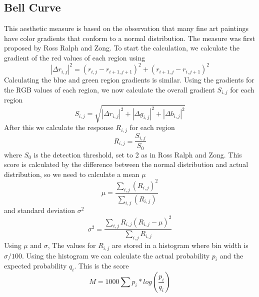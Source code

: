 \documentclass{article}
\begin{document}
\subsection*{Bell Curve}
This aesthetic measure is based on the observation that many fine art paintings have color gradients that conform to a normal distribution. The measure was first proposed by Ross Ralph and Zong.
To start the calculation, we calculate the gradient of the red values of each region using
\begin{equation*}
    |\Delta r_{i,j}|^2 = (r_{i,j} - r_{i+1,j+1})^2 + (r_{i+1,j} - r_{i,j+1})^2
\end{equation*}
Calculating the blue and green region gradients is similar. Using the gradients for the RGB values of each region, we now calculate the overall gradient $S_{i,j}$ for each region
\begin{equation*}
    S_{i,j} = \sqrt{|\Delta r_{i,j}|^2 + |\Delta g_{i,j}|^2 + |\Delta b_{i,j}|^2}
\end{equation*}
After this we calculate the response $R_{i,j}$ for each region 
\begin{equation*}
    R_{i,j} = \frac{S_{i,j}}{S_0}
\end{equation*}
where $S_0$ is the detection threshold, set to 2 as in Ross Ralph and Zong.
This score is calculated by the difference between the normal distribution and actual distribution, so we need to calculate a mean $\mu$
\begin{equation*}
    \mu = \frac{\sum_{i,j}(R_{i,j})^2}{\sum_{i,j}(R_{i,j})}
\end{equation*}
and standard deviation $\sigma^2$
\begin{equation*}
    \sigma^2 = \frac{\sum_{i,j}R_{i,j}(R_{i,j} - \mu)^2}{\sum_{i,j}R_{i,j}}
\end{equation*}
Using $\mu$ and $\sigma$, The values for $R_{i,j}$ are stored in a histogram where bin width is $\sigma /100$. Using the histogram we can calculate the actual probability $p_i$ and the expected probability $q_i$. This is the score
\begin{equation*}
    M = 1000\sum p_i * log(\frac{p_i}{q_i})
\end{equation*}
\end{document}
